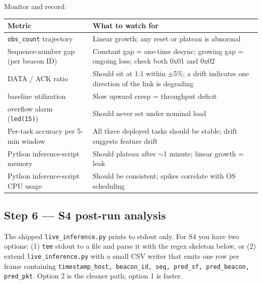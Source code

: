 \documentclass[11pt,letterpaper]{article}
\begin{document}
Monitor and record:

\begin{table}[h!]
	\centering
	\renewcommand{\arraystretch}{1.3}
	\begin{tabularx}{\textwidth}{l X}
		\toprule
		\textbf{Metric} & \textbf{What to watch for} \\
		\midrule
		\texttt{obs\_count} trajectory       & Linear growth; any reset or plateau is abnormal \\
		Sequence-number gap (per beacon ID) & Constant gap = one-time desync; growing gap = ongoing loss; check both 0x01 and 0x02 \\
		DATA / ACK ratio                     & Should sit at 1:1 within $\pm$5\%; a drift indicates one direction of the link is degrading \\
		\FIFO{} baseline utilization         & Slow upward creep = throughput deficit \\
		\FIFO{} overflow alarm (\texttt{led(15)}) & Should never set under nominal load \\
		Per-task accuracy per 5-min window   & All three deployed tasks should be stable; drift suggests feature drift \\
		Python inference-script memory        & Should plateau after $\sim$1 minute; linear growth = leak \\
		Python inference-script \mbox{CPU} usage     & Should be consistent; spikes correlate with \mbox{OS} scheduling \\
		\bottomrule
	\end{tabularx}
\end{table}

\subsection{Step 6 --- S4 post-run analysis}

\begin{tcolorbox}[infobox={CSV logging is a local enhancement to \texttt{live\_inference.py}}]
The shipped \texttt{live\_inference.py} prints to stdout only. For S4 you have two options: (1) \texttt{tee} stdout to a file and parse it with the regex skeleton below, or (2) extend \texttt{live\_inference.py} with a small CSV writer that emits one row per frame containing \texttt{timestamp\_host, beacon\_id, seq, pred\_sf, pred\_beacon, pred\_pkt}. Option 2 is the cleaner path; option 1 is faster.
\end{tcolorbox}
\end{document}
